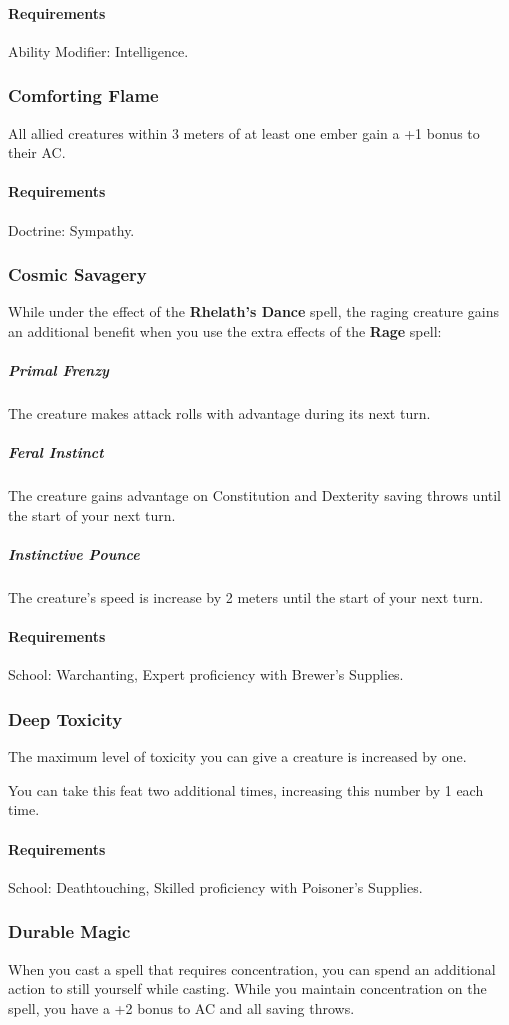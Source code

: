     \paragraph{Requirements} Ability Modifier: Intelligence.
\subsubsection{Comforting Flame} \label{feat::comfortingflame}
    All allied creatures within 3 meters of at least one ember gain a +1 bonus to their AC.
    \paragraph{Requirements} Doctrine: Sympathy.
\subsubsection{Cosmic Savagery} \label{feat::cosmicsavaregy}
    While under the effect of the \textbf{Rhelath's Dance} spell, the raging creature gains an additional benefit when you use the extra effects of the \textbf{Rage} spell:

    \subparagraph{Primal Frenzy}
    The creature makes attack rolls with advantage during its next turn.
    \subparagraph{Feral Instinct}
    The creature gains advantage on Constitution and Dexterity saving throws until the start of your next turn.
    \subparagraph{Instinctive Pounce}
    The creature's speed is increase by 2 meters until the start of your next turn.
    \paragraph{Requirements} School: Warchanting, Expert proficiency with Brewer's Supplies.
\subsubsection{Deep Toxicity} \label{feat::deeptoxicity}
    The maximum level of toxicity you can give a creature is increased by one.

    You can take this feat two additional times, increasing this number by 1 each time.
    \paragraph{Requirements} School: Deathtouching, Skilled proficiency with Poisoner's Supplies.
\subsubsection{Durable Magic} \label{feat::durablemagic}
    When you cast a spell that requires concentration, you can spend an additional action to still yourself while casting.
    While you maintain concentration on the spell, you have a +2 bonus to AC and all saving throws.
